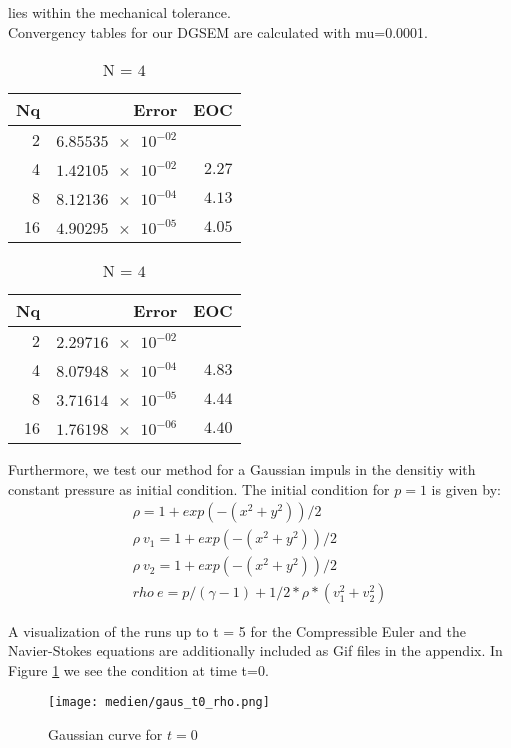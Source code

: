 \documentclass[11pt]{scrartcl}
\begin{document}
lies within the mechanical tolerance.\\

Convergency tables for our DGSEM are calculated with mu=0.0001.

\begin{table}[H]
\parbox{.45\linewidth}{
\centering
    \begin{tabular}{|r|r|r|}
    \hline\hline
    \textbf{Nq} & \textbf{Error} & \textbf{EOC} \\\hline
    2 & $\num{6.85535e-02}$ &  \\
    4 & $\num{1.42105e-02}$ & $\num{2.27}$ \\
    8 & $\num{8.12136e-04}$ & $\num{4.13}$ \\
    16 & $\num{4.90295e-05}$ & $\num{4.05}$ \\\hline\hline
  \end{tabular} 
  \caption{N = $3$}
  }
  \hspace{0.5cm}
  \parbox{.45\linewidth}{
	\centering
    \begin{tabular}{|r|r|r|}
    \hline\hline
    \textbf{Nq} & \textbf{Error} & \textbf{EOC} \\\hline
    2 & $\num{2.29716e-02}$ &  \\
    4 & $\num{8.07948e-04}$ & $\num{4.83}$ \\
    8 & $\num{3.71614e-05}$ & $\num{4.44}$ \\
    16 & $\num{1.76198e-06}$ & $\num{4.40}$ \\\hline\hline
  \end{tabular}
   \caption{N = $4$}
  }
\end{table}

Furthermore, we test our method for a Gaussian impuls in the densitiy with constant pressure as initial condition.
The initial condition for $p=1$ is given by:
\begin{align*}
	\rho = 1 + exp(-(x^2 + y^2)) / 2 \\
	\rho \ v_1 = 1 + exp(-(x^2 + y^2)) / 2 \\
	\rho \ v_2 = 1 + exp(-(x^2 + y^2)) / 2 \\
	rho \ e = p / (\gamma - 1) + 1 / 2 * \rho * (v_1^2 + v_2^2)
\end{align*}

A visualization of the runs up to t = 5 for the Compressible Euler and the Navier-Stokes equations are additionally included as Gif files in the appendix. 
In Figure \ref{gaust0} we see the condition at time t=0.
\begin{figure}[H]
	\centering
	\texttt{[image: medien/gaus\_t0\_rho.png]}
	\caption{Gaussian curve for $t=0$}
	\label{gaust0}
\end{figure}
\end{document}
